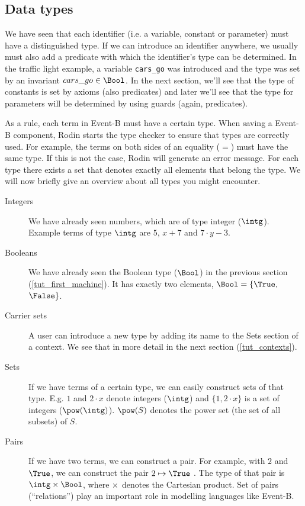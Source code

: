 \subsection{Data types}
\label{tut_data_types}
We have seen that each identifier (i.e. a variable, constant or parameter) must have a distinguished type.
If we can introduce an identifier anywhere, we usually must also add a predicate with which the
identifier's type can be determined. In the traffic light example, a variable \texttt{cars\_go} was
introduced and the type was set by an invariant $cars\_go \in \Bool$. In the next section, we'll see that the type of constants is set by axioms (also predicates) and later we'll see that the type for parameters will be determined by using guards (again, predicates).

As a rule, each term in Event-B must have a certain type. 
When saving a Event-B component, Rodin starts the type checker to ensure that types are correctly used. For example, the terms on both sides of an equality ($=$) must have the same type. If this is not the case, Rodin will generate an error message.
For each type there exists a set that denotes exactly all elements that belong the type. We will now briefly
give an overview about all types you might encounter.

\begin{description}
\item[Integers] 
  We have already seen numbers, which are of type integer ($\intg$).
  Example terms of type $\intg$ are $5$, $x+7$ and $7 \cdot y - 3$.
\item[Booleans]
  We have already seen the Boolean type ($\Bool$) in the previous section (\ref{tut_first_machine}).
  It has exactly two elements, $\Bool = \{\True,$ $\False\}$.
\item[Carrier sets]
  A user can introduce a new type by adding its name to the
  \textsf{Sets} section of a context. We see that in more detail in the next section (\ref{tut_contexts}).
\item[Sets]
  If we have terms of a certain type, we can easily construct sets of that type.
  E.g. $1$ and $2\cdot x$ denote integers ($\intg$) and $\{1,2\cdot x\}$ is a set of integers ($\pow(\intg)$).
  $\pow(S)$  denotes the power set (the set of all subsets) of $S$.
\item[Pairs]
  If we have two terms, we can construct a pair. For example, with $2$ and $\True$, we
  can construct the pair $2\mapsto\True$ .
  The type of that pair is $\intg\cprod\Bool$, where $\mathbin\times$ denotes the Cartesian product.
  Set of pairs (``relations'') play an important role in modelling languages like Event-B.
\end{description}


